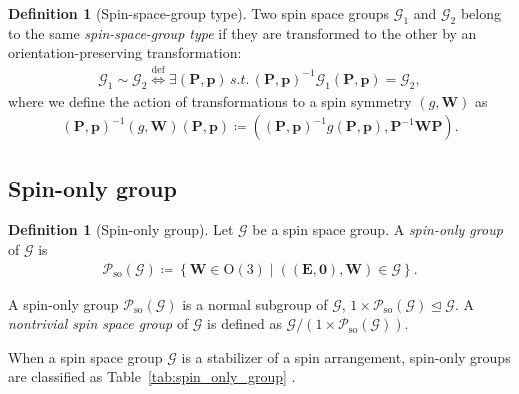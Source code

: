 \documentclass[a4paper, 11pt]{article}
\theoremstyle{definition}
\newcommand{\term}[1]{\textit{#1}}
\newcommand{\relmiddle}[1]{\mathrel{}\middle#1\mathrel{}}
\newcommand{\set}[2]{\left\{ #1 \relmiddle| #2 \right\}}
\newtheorem{definition}[theorem]{Definition}
\begin{document}
\begin{screen}
  \begin{definition}[Spin-space-group type]
    Two spin space groups $\mathcal{G}_{1}$ and $\mathcal{G}_{2}$ belong to the same \term{spin-space-group type} if they are transformed to the other by an orientation-preserving transformation:
    \begin{align}
      \mathcal{G}_{1} \sim \mathcal{G}_{2}
      \overset{\mathrm{def}}{\Longleftrightarrow}
      \exists (\bm{P}, \bm{p}) \,s.t.\, (\bm{P}, \bm{p})^{-1} \mathcal{G}_{1} (\bm{P}, \bm{p}) = \mathcal{G}_{2},
    \end{align}
    where we define the action of transformations to a spin symmetry $(g, \bm{W})$ as
    \begin{align}
      (\bm{P}, \bm{p})^{-1} (g, \bm{W}) (\bm{P}, \bm{p})
      \coloneqq
      ((\bm{P}, \bm{p})^{-1} g (\bm{P}, \bm{p}), \bm{P}^{-1}\bm{W}\bm{P}).
    \end{align}
  \end{definition}
\end{screen}

\subsection{Spin-only group}

\begin{screen}
  \begin{definition}[Spin-only group]
    Let $\mathcal{G}$ be a spin space group.
    A \term{spin-only group} of $\mathcal{G}$ is
    \begin{align}
      \mathcal{P}_{\mathrm{so}}(\mathcal{G})
      \coloneqq
      \set{ \bm{W} \in \mathrm{O}(3) }{ ((\bm{E}, \bm{0}), \bm{W}) \in \mathcal{G} }.
    \end{align}
  \end{definition}
\end{screen}

A spin-only group $\mathcal{P}_{\mathrm{so}}(\mathcal{G})$ is a normal subgroup of $\mathcal{G}$, $1 \times \mathcal{P}_{\mathrm{so}}(\mathcal{G}) \trianglelefteq \mathcal{G}$.
A \term{nontrivial spin space group} of $\mathcal{G}$ is defined as $\mathcal{G} / (1 \times \mathcal{P}_{\mathrm{so}}(\mathcal{G}))$.

When a spin space group $\mathcal{G}$ is a stabilizer of a spin arrangement, spin-only groups are classified as Table~\ref{tab:spin_only_group} \cite{LITVIN1974538,PhysRevX.12.021016}.
\end{document}
